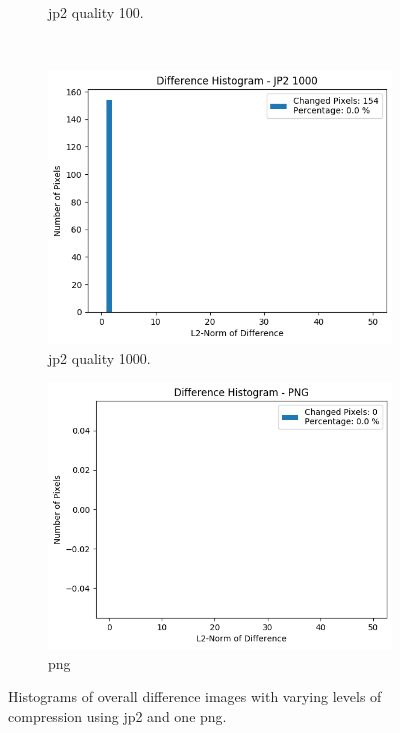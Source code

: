 \begin{figure}[htb]
\begin{subfigure}[b]{0.49\textwidth}
            \caption{\gls{jp2} quality 100.}
            \label{fig:img_quality_histogram_100}
        \end{subfigure}
        \\
        \begin{subfigure}[b]{0.49\textwidth}
            \centering
            \includegraphics[width=\textwidth]{doc/thesis/0_figures/compare_quality/set1/jp2_1000_diff_histogram.png}
            \caption{\gls{jp2} quality 1000.}
            \label{fig:img_quality_histogram_1000}
        \end{subfigure}
        \begin{subfigure}[b]{0.49\textwidth}
            \centering
            \includegraphics[width=\textwidth]{doc/thesis/0_figures/compare_quality/set1/png_diff_histogram.png}
            \caption{\gls{png}}
            \label{fig:img_quality_histogram_png}
        \end{subfigure}
    \caption{Histograms of overall difference images with varying levels of compression using \gls{jp2} and one \gls{png}.}
    \label{fig:img_quality_histogram}
\end{figure}

